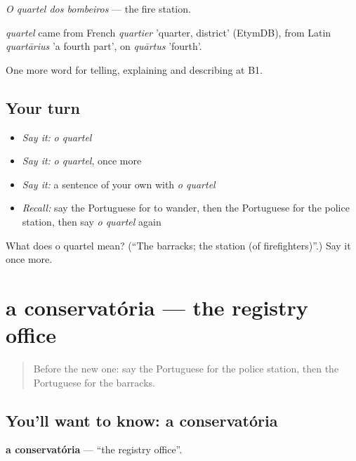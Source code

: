 \emph{O quartel dos bombeiros} — the fire station.

\begin{cousinweb}
\emph{quartel} came from French \emph{quartier} 'quarter, district' (EtymDB), from Latin \emph{quartārius} 'a fourth part', on \emph{quārtus} 'fourth'.
\end{cousinweb}

\begin{grammarlens}[title={What you've built}]
One more word for telling, explaining and describing at B1.
\end{grammarlens}

\subsection*{Your turn}
\begin{itemize}
\raggedright
  \item \emph{Say it:} \emph{o quartel}
  \item \emph{Say it:} \emph{o quartel}, once more
  \item \emph{Say it:} a sentence of your own with \emph{o quartel}
  \item \emph{Recall:} say the Portuguese for to wander, then the Portuguese for the police station, then say \emph{o quartel} again
\end{itemize}

\begin{tcolorbox}[breakable,colback=teal!4,colframe=teal!35!black,title={Before you move on}]
What does o quartel mean? (\textquotedblleft{}The barracks; the station (of firefighters)\textquotedblright{}.) Say it once more.
\end{tcolorbox}
\section[a conservatória]{a conservatória — the registry office}

\label{lesson:PT-C443-conservatoria}



\begin{quote}
Before the new one: say the Portuguese for the police station, then the Portuguese for the barracks.
\end{quote}

\subsection*{You'll want to know: a conservatória}
\textbf{a conservatória} — \textquotedblleft{}the registry office\textquotedblright{}.

